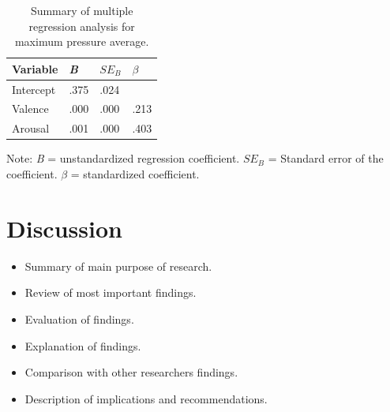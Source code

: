 \documentclass{sig-alternate}
\begin{document}
\begin{table}[ht]
\centering
	\begin{threeparttable}
		\caption{Summary of multiple regression analysis for maximum pressure average.\label{tab:summary_multiple_regression_max_pressure_avg}}
		\begin{tabularx}{0.9\linewidth}{@{}lYYY@{}}
			\toprule
			Variable  & \textit{B} & \textit{$SE_{B}$} & \textit{$\beta$} \\ \midrule
			Intercept & .375       & .024              &                  \\
			Valence   & .000       & .000              & .213             \\
			Arousal   & .001       & .000              & .403             \\ \bottomrule
		\end{tabularx}
	\begin{tablenotes}
		\small
		\item Note: \textit{B} = unstandardized regression coefficient. \textit{$SE_B$} = Standard error of the coefficient. $\beta$ = standardized coefficient.
	\end{tablenotes}
	\end{threeparttable}
\end{table}

\section{Discussion} %
\label{sec:discussion}
\begin{itemize}
	\item Summary of main purpose of research.
	\item Review of most important findings.
	\item Evaluation of findings.
	\item Explanation of findings.
	\item Comparison with other researchers findings.
	\item Description of implications and recommendations.
\end{itemize}




%
%
\end{document}
